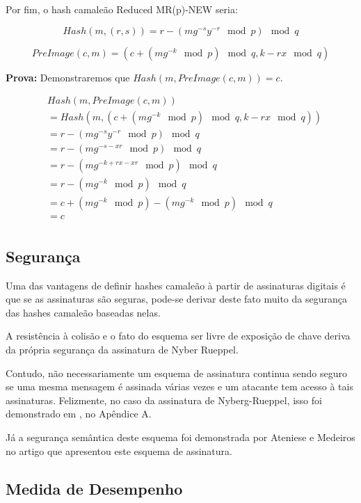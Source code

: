 \documentclass[a4paper]{article}
\begin{document}
 Por fim, o hash camaleão Reduced MR(p)-NEW seria:
 
 $$
 Hash(m, (r, s)) = r-(mg^{-s}y^{-r} \mod p) \mod q
 $$
 
 $$
 PreImage(c, m) = (c+(mg^{-k} \mod p) \mod q, k-rx \mod q)
 $$
 
 \textbf{Prova: }Demonstraremos que $Hash(m, PreImage(c, m)) = c$.
 
 \begin{equation*}
 \begin{split}
 &Hash(m, PreImage(c, m))\\
 &= Hash(m, (c+(mg^{-k} \mod p) \mod q, k-rx \mod q))\\
 &= r-(mg^{-s}y^{-r} \mod p) \mod q\\
 &= r-(mg^{-s-xr} \mod p) \mod q\\
 &= r-(mg^{-k+rx-xr} \mod p) \mod q\\
 &= r-(mg^{-k} \mod p) \mod q\\
 &= c+(mg^{-k} \mod p)-(mg^{-k} \mod p) \mod q\\
 &= c\\
 \end{split}
 \end{equation*}
 
 \subsection{Segurança}
 
 Uma das vantagens de definir hashes camaleão à partir de assinaturas
 digitais é que se as assinaturas são seguras, pode-se derivar deste
 fato muito da segurança das hashes camaleão baseadas nelas.
 
 A resistência à colisão e o fato do esquema ser livre de exposição de
 chave deriva da própria segurança da assinatura de Nyber Rueppel.
 
 Contudo, não necessariamente um esquema de assinatura continua sendo
 seguro se uma mesma mensagem é assinada várias vezes e um atacante tem
 acesso à tais assinaturas. Felizmente, no caso da assinatura de
 Nyberg-Rueppel, isso foi demonstrado em \cite{twin}, no Apêndice A.
 
 Já a segurança semântica deste esquema foi demonstrada por Ateniese e
 Medeiros no artigo que apresentou este esquema de assinatura.
 
 \subsection{Medida de Desempenho}
 
\end{document}
